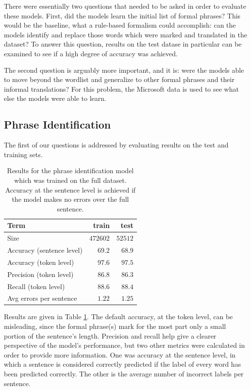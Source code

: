 There were essentially two questions that needed to be asked in order to evaluate these models. First, did the models learn the initial list of formal phrases? This would be the baseline, what a rule-based formalism could accomplish: can the models identify and replace those words which were marked and translated in the dataset? To answer this question, results on the test datase in particular can be examined to see if a high degree of accuracy was achieved.

The second question is arguably more important, and it is: were the models able to move beyond the wordlist and generalize to other formal phrases and their informal translations? For this problem, the Microsoft data is used to see what else the models were able to learn.


\subsection{Phrase Identification}

The first of our questions is addressed by evaluating results on the test and training sets.

\begin{table}[h]
\centering
 \begin{tabular}{|| l | r | r ||}
 \hline
 Term & train & test \\ [0.3ex] 
 \hline\hline
 Size & $472602$ & $52512$ \\
 \hline
 Accuracy (sentence level) & $69.2$ & $68.9$ \\
 \hline
 Accuracy (token level) & $97.6$ & $97.5$ \\
 \hline
 Precision (token level) & $86.8$ & $86.3$ \\
 \hline
 Recall (token level) & $88.6$ & $88.4$ \\
 \hline
 Avg errors per sentence & $1.22$ & $1.25$ \\
 \hline
\end{tabular}
\caption{Results for the phrase identification model which was trained on the full dataset. Accuracy at the sentence level is achieved if the model makes no errors over the full sentence.}
\label{phrase-ident-main-results}
\end{table}

Results are given in Table \ref{phrase-ident-main-results}. The default accuracy, at the token level, can be misleading, since the formal phrase(s) mark for the most part only a small portion of the sentence's length. Precision and recall help give a clearer perspective of the model's performance, but two other metrics were calculated in order to provide more information. One was accuracy at the sentence level, in which a sentence is considered correctly predicted if the label of every word has been predicted correctly. The other is the average number of incorrect labels per sentence.

